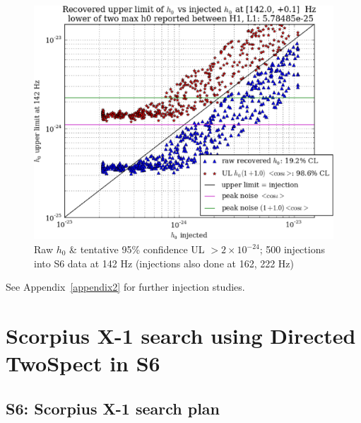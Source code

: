 \begin{figure}
\begin{center}
\includegraphics[width=0.4\paperwidth,height=0.2\paperheight]{plots/h0UL-vs-h0injected-142-0Hz.eps}
\caption{
Raw $h_0$ \& tentative 95\% confidence UL $>2\times10^{-24}$; 500 injections
into S6 data at 142 Hz (injections also done at 162, 222 Hz)}
\end{center}
\end{figure}

See Appendix~\ref{appendix2} for further injection studies.




        \section{Scorpius X-1 search using Directed TwoSpect in S6}
        \label{directed_results}
 




\subsection{S6: Scorpius X-1 search plan}

